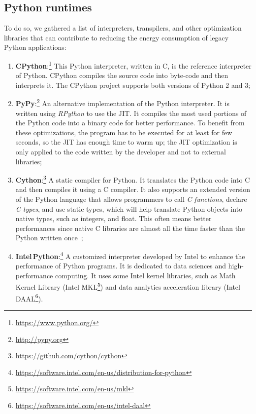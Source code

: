 \subsection{Python runtimes}\label{python:sec_interpreters}
To do so, we gathered a list of interpreters, transpilers, and other optimization libraries that can contribute to reducing the energy consumption of legacy Python applications:
\begin{enumerate}
      \item \textbf{CPython}:\footnote{\url{https://www.python.org/}}
            This Python interpreter, written in C, is the reference interpreter of Python.
            CPython compiles the source code into byte-code and then interprets it.
            The CPython project supports both versions of Python 2 and 3;
      \item \textbf{PyPy}:\footnote{\url{http://pypy.org}}
            An alternative implementation of the Python interpreter.
            It is written using \emph{RPython} to use the JIT.
            It compiles the most used portions of the Python code into a binary code for better performance.
            To benefit from these optimizations, the program has to be executed for at least for few seconds, so the JIT has enough time to warm up; the JIT optimization is only applied to the code written by the developer and not to external libraries;
      \item \textbf{Cython}:\footnote{\url{https://github.com/cython/cython}}
            A static compiler for Python.
            It translates the Python code into C and then compiles it using a C compiler.
            It also supports an extended version of the Python language that allows programmers to call \emph{C functions}, declare \emph{C types}, and use static types, which will help translate Python objects into native types, such as integers, and float.
            This often means better performances since native C libraries are almost all the time faster than the Python written once~\cite{pereira_energy_2017};
      \item \textbf{Intel\,Python}:\footnote{\url{https://software.intel.com/en-us/distribution-for-python}}
            A customized interpreter developed by Intel to enhance the performance of Python programs.
            It is dedicated to data sciences and high-performance computing.
            It uses some Intel kernel libraries, such as Math Kernel Library (Intel MKL\footnote{\url{https://software.intel.com/en-us/mkl}}) and data analytics acceleration library (Intel DAAL\footnote{\url{https://software.intel.com/en-us/intel-daal}}).

\end{enumerate}
